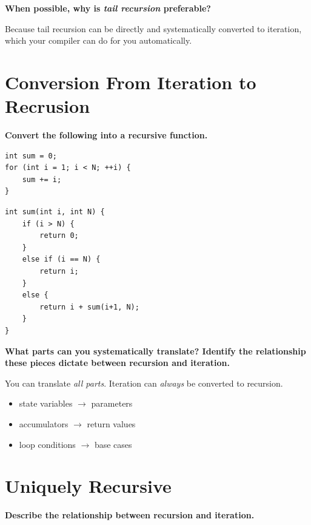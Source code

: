 \documentclass[12pt, letterpaper]{article}
\newcommand{\question}[1]{\textbf{#1}\par}
\newenvironment{answerblock}{\color{Green4}}{\normalcolor\vspace{1em}}
\begin{document}
\begin{minipage}{\textwidth}
\question{When possible, why is \emph{tail recursion} preferable?}
\begin{answerblock}
Because tail recursion can be directly and systematically converted to
iteration, which your compiler can do for you automatically.
\end{answerblock}
\end{minipage}

\pagebreak
\section{Conversion From Iteration to Recrusion}

\question{Convert the following into a recursive function.}

\begin{verbatim}
int sum = 0;
for (int i = 1; i < N; ++i) {
    sum += i;
}
\end{verbatim}

\begin{verbatim}
int sum(int i, int N) {
    if (i > N) {
        return 0;
    }
    else if (i == N) {
        return i;
    }
    else {
        return i + sum(i+1, N);
    }
}
\end{verbatim}

\question{What parts can you systematically translate? Identify the
relationship these pieces dictate between recursion and iteration.}

\begin{answerblock}
    You can translate \emph{all parts}. Iteration can \emph{always} be
    converted to recursion.

    \begin{itemize}
        \item state variables \(\rightarrow\) parameters
        \item accumulators \(\rightarrow\) return values
        \item loop conditions \(\rightarrow\) base cases
    \end{itemize}
\end{answerblock}

\pagebreak
\section{Uniquely Recursive}

\question{Describe the relationship between recursion and iteration.}
\end{document}
